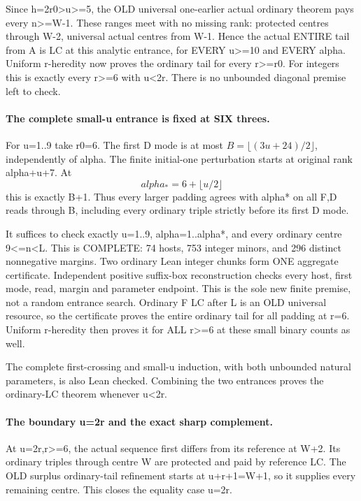 Since h=2r0>u>=5, the OLD universal one-earlier actual ordinary
theorem pays every n>=W-1. These ranges meet with no missing
rank: protected centres through W-2, universal actual centres
from W-1. Hence the actual ENTIRE tail from A is LC at this
analytic entrance, for EVERY u>=10 and EVERY alpha.
Uniform r-heredity now proves the ordinary tail for every
r>=r0. For integers this is exactly every r>=6 with u<2r.
There is no unbounded diagonal premise left to check.

\paragraph{The complete small-u entrance is fixed at SIX threes.}
For u=1..9 take r0=6. The first D mode is at most
$B=\lfloor(3u+24)/2\rfloor$, independently of alpha. The finite
initial-one perturbation starts at original rank alpha+u+7.
At
\[
                          alpha_*=6+\lfloor u/2\rfloor
\]
this is exactly B+1. Thus every larger padding agrees with alpha*
on all F,D reads through B, including every ordinary triple
strictly before its first D mode.

It suffices to check exactly u=1..9, alpha=1..alpha*, and every
ordinary centre 9<=n<L. This is COMPLETE: 74 hosts, 753 integer
minors, and 296 distinct nonnegative margins. Two ordinary Lean
integer chunks form ONE aggregate certificate. Independent positive
suffix-box reconstruction checks every host, first mode, read,
margin and parameter endpoint. This is the sole new finite premise,
not a random entrance search. Ordinary F LC after L is an OLD
universal resource, so the certificate proves the entire ordinary
tail for all padding at r=6. Uniform r-heredity then proves it
for ALL r>=6 at these small binary counts as well.

The complete first-crossing and small-u induction, with both
unbounded natural parameters, is also Lean checked. Combining
the two entrances proves the ordinary-LC theorem whenever u<2r.

\paragraph{The boundary u=2r and the exact sharp complement.}
At u=2r,r>=6, the actual sequence first differs from its reference
at W+2. Its ordinary triples through centre W are protected and
paid by reference LC. The OLD surplus ordinary-tail refinement
starts at u+r+1=W+1, so it supplies every remaining centre.
This closes the equality case u=2r.

